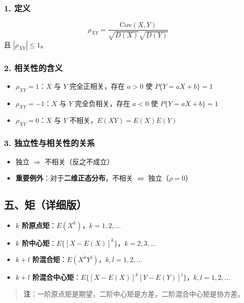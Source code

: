 \documentclass[12pt,a4paper]{ctexart}
\newenvironment{myquote}
  {\par\vspace{0.5em}\begin{quote}\sffamily\color{gray}}
  {\end{quote}\vspace{0.5em}}
\begin{document}
\subsubsection{1. 定义}
\[
    \rho_{XY} = \frac{\text{Cov}(X, Y)}{\sqrt{D(X)}\sqrt{D(Y)}}
\]
且 $|\rho_{XY}| \le 1$。

\subsubsection{2. 相关性的含义}
\begin{itemize}[noitemsep]
    \item $\rho_{XY} = 1$：$X$ 与 $Y$ 完全正相关，存在 $a > 0$ 使 $P\{Y = aX + b\} = 1$
    \item $\rho_{XY} = -1$：$X$ 与 $Y$ 完全负相关，存在 $a < 0$ 使 $P\{Y = aX + b\} = 1$
    \item $\rho_{XY} = 0$：$X$ 与 $Y$ 不相关，$E(XY) = E(X)E(Y)$
\end{itemize}

\subsubsection{3. 独立性与相关性的关系}
\begin{itemize}[noitemsep]
    \item 独立 $\Rightarrow$ 不相关（反之不成立）
    \item \textbf{重要例外}：对于\textbf{二维正态分布}，不相关 $\iff$ 独立（$\rho = 0$）
\end{itemize}

\subsection{五、矩（详细版）}
\begin{itemize}[noitemsep]
    \item \textbf{$k$ 阶原点矩}：$E(X^k)$，$k = 1, 2, \dots$
    \item \textbf{$k$ 阶中心矩}：$E\{[X - E(X)]^k\}$，$k = 2, 3, \dots$
    \item \textbf{$k+l$ 阶混合矩}：$E(X^k Y^l)$，$k, l = 1, 2, \dots$
    \item \textbf{$k+l$ 阶混合中心矩}：$E\{[X - E(X)]^k [Y - E(Y)]^l\}$，$k, l = 1, 2, \dots$
\end{itemize}

\begin{myquote}
    \textbf{注}：一阶原点矩是期望，二阶中心矩是方差，二阶混合中心矩是协方差。
\end{myquote}
\end{document}
